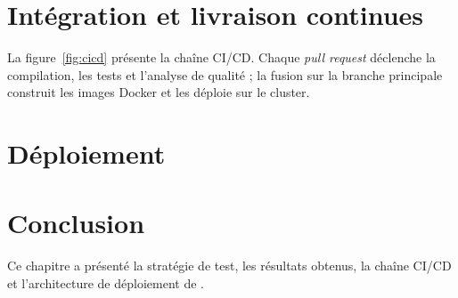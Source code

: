 \section{Intégration et livraison continues}
La figure~\ref{fig:cicd} présente la chaîne CI/CD. Chaque \textit{pull request} déclenche la compilation, les tests et l'analyse de qualité ; la fusion sur la branche principale construit les images Docker et les déploie sur le cluster.


\section{Déploiement}

\section*{Conclusion}
Ce chapitre a présenté la stratégie de test, les résultats obtenus, la chaîne CI/CD et l'architecture de déploiement de \nomprojet.
